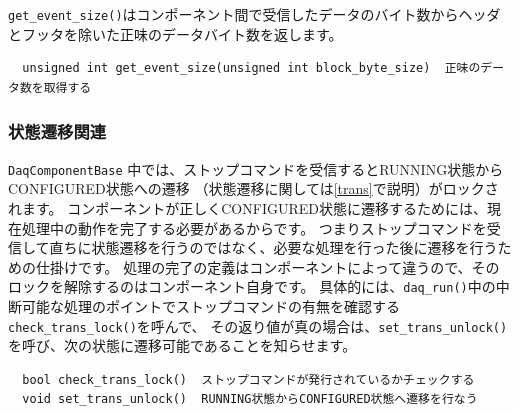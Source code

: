 \documentclass[a4j,10pt,dvips,onecolumn,oneside,final]{jarticle}%
\begin{document}
\verb|get_event_size()|はコンポーネント間で受信したデータのバイト数からヘッダとフッタを除いた正味のデータバイト数を返します。
\begin{Verbatim}
  unsigned int get_event_size(unsigned int block_byte_size)  正味のデータ数を取得する
\end{Verbatim}

\subsubsection{状態遷移関連}\label{state}
\verb|DaqComponentBase| 中では、ストップコマンドを受信するとRUNNING状態からCONFIGURED状態への遷移
（状態遷移に関しては\ref{trans}で説明）がロックされます。
コンポーネントが正しくCONFIGURED状態に遷移するためには、現在処理中の動作を完了する必要があるからです。
つまりストップコマンドを受信して直ちに状態遷移を行うのではなく、必要な処理を行った後に遷移を行うための仕掛けです。
処理の完了の定義はコンポーネントによって違うので、そのロックを解除するのはコンポーネント自身です。
具体的には、\verb|daq_run()|中の中断可能な処理のポイントでストップコマンドの有無を確認する\verb|check_trans_lock()|を呼んで、
その返り値が真の場合は、\verb|set_trans_unlock()|を呼び、次の状態に遷移可能であることを知らせます。

\begin{Verbatim}
  bool check_trans_lock()  ストップコマンドが発行されているかチェックする
  void set_trans_unlock()  RUNNING状態からCONFIGURED状態へ遷移を行なう
\end{Verbatim}
\end{document}
